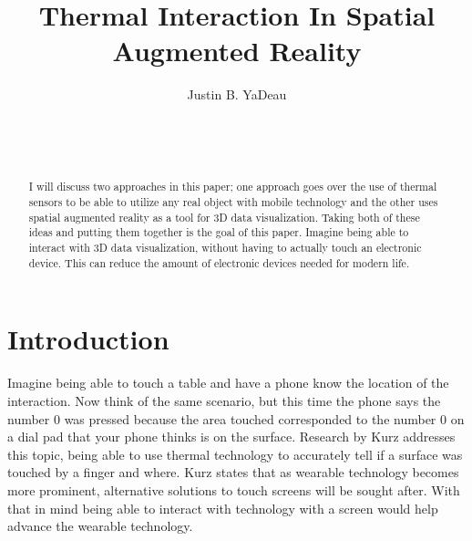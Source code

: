 \documentclass{sig-alternate}
\begin{document}

\title{Thermal Interaction In Spatial Augmented Reality}


\author{
\alignauthor
Justin B. YaDeau\\
	\\
	\\
	\\
}

\maketitle

\begin{abstract}
I will discuss two approaches in this paper; one approach goes over the use of thermal sensors to be able to utilize any real object with mobile technology and the other uses spatial augmented reality as a tool for 3D data visualization. Taking both of these ideas and putting them together is the goal of this paper. Imagine being able to interact with 3D data visualization, without having to actually touch an electronic device. This can reduce the amount of electronic devices needed for modern life.
\end{abstract}


\section{Introduction}
\label{sec:Introduction}
Imagine being able to touch a table and have a phone know the location of the interaction. Now think of the same scenario, but this time the phone says the number 0 was pressed because the area touched corresponded to the number 0 on a dial pad that your phone thinks is on the surface. Research by Kurz \cite{Thermal} addresses this topic, being able to use thermal technology to accurately tell if a surface was touched by a finger and where. Kurz \cite{Thermal} states that as wearable technology becomes more prominent, alternative solutions to touch screens will be sought after. With that in mind being able to interact with technology with a screen would help advance the wearable technology.    
\end{document}
